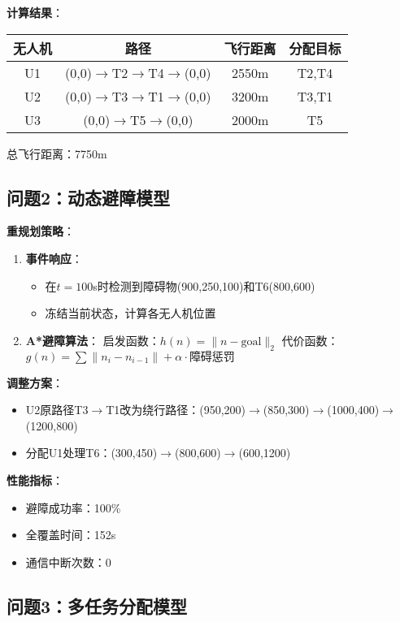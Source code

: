 \documentclass[12pt,fontset=adobe]{ctexart}
\begin{document}
\textbf{计算结果}：
\begin{tabular}{|c|c|c|c|}
  \hline
  无人机 & 路径 & 飞行距离 & 分配目标 \\
  \hline
  U1 & (0,0)$\to$T2$\to$T4$\to$(0,0) & 2550m & T2,T4 \\
  U2 & (0,0)$\to$T3$\to$T1$\to$(0,0) & 3200m & T3,T1 \\
  U3 & (0,0)$\to$T5$\to$(0,0) & 2000m & T5 \\
  \hline
\end{tabular}

总飞行距离：7750m

\subsection{问题2：动态避障模型}

\textbf{重规划策略}：
\begin{enumerate}
  \item \textbf{事件响应}：
    \begin{itemize}
      \item 在$t=100$s时检测到障碍物(900,250,100)和T6(800,600)
      \item 冻结当前状态，计算各无人机位置
    \end{itemize}
  \item \textbf{A*避障算法}：
    启发函数：$h(n) = \|n-\text{goal}\|_2$
    代价函数：$g(n) = \sum \|n_i-n_{i-1}\| + \alpha \cdot \text{障碍惩罚}$
\end{enumerate}

\textbf{调整方案}：
\begin{itemize}
  \item U2原路径T3$\to$T1改为绕行路径：(950,200)$\to$(850,300)$\to$(1000,400)$\to$(1200,800)
  \item 分配U1处理T6：(300,450)$\to$(800,600)$\to$(600,1200)
\end{itemize}

\textbf{性能指标}：
\begin{itemize}
  \item 避障成功率：100\%
  \item 全覆盖时间：152s
  \item 通信中断次数：0
\end{itemize}

\subsection{问题3：多任务分配模型}
\end{document}
